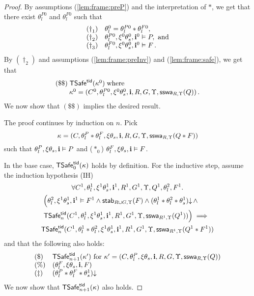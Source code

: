 \begin{proof}
By assumptions (\ref{lem:frame:preP}) %
and the interpretation of $*$, we get that 
there exist $\theta^{P0}_{l}$ and $\theta_l^{F0}$ such that 
$$
\begin{array}{ll}
(\dag_1) &\theta^0_l =\theta^{P0}_{l}*\theta_l^{F0}, \\
(\dag_2) &\theta_l^{P0},\xi^0\theta^0_s,\intp^0 \vDash P, ~\text{and}\\
(\dag_3) &\theta_l^{F0},\xi^0\theta^0_s,\intp^0 \vDash F \,.
\end{array}
$$
By $(\dag_2)$  and assumptions (\ref{lem:frame:preInv}) and (\ref{lem:frame:safe}),
we get that 
\[
\begin{array}{l}
 (\$\$) \; \safe(\kappa^0) \;\text{where}\; \\[1pt]
 \qquad \kappa^0 = (C^0,\theta^{P0}_l,\xi^0\theta^0_s,\intp,R,G,\Upsilon, \sswa{Q}{R}{\Upsilon})\,.
\end{array}
\]
We now show that $(\$\$)$ implies the desired result.

The proof continues by induction on $n$.
Pick 
$$
\kappa=(C,\theta_l^P*\theta_l^F,\xi\theta_s,\intp,R,G,\Upsilon, \sswa{Q*F}{R}{\Upsilon})
$$
such that $\theta_l^P,\xi\theta_s,\intp\vDash P$ and ($*_0$) $\theta_l^F,\xi\theta_s,\intp\vDash F$.

In the base case, $\safe_0(\kappa)$ holds by definition.
For the inductive step, 
assume 
the induction hypothesis (IH)  
\begin{multline*}
  \forall C^1,\theta^1_l,\xi^1\theta^1_s,\intp^1,R^1,G^1,\Upsilon,Q^1,\theta^2_l,F^1.\\
  \Big(\theta^2_l,\xi^1\theta^1_s,\intp^1 \vDash F^1 \land  
  \stable{F}{R \cup G}{\Upsilon} \land \consistent{\theta^1_l * \theta^2_l * \theta^1_s} \land\mbox{} 
  \qquad \\ 
  \safe_n(C^1,\theta^1_l,\xi^1\theta^1_s,\intp^1,R^1,G^1,\Upsilon,\sswa{Q^1}{R^1}{\Upsilon})\Big)
  \implies \mbox{} \\
  \safe_n(C^1,\theta^1_l*\theta^2_l,\xi^1\theta^1_s,\intp^1,R^1,G^1,\Upsilon,
  				\sswa{Q^1*F^1}{R^1}{\Upsilon})
\end{multline*}
and that the following also holds:
$$
\begin{array}{ll}
(\$ )   &\safe_{n+1}(\kappa') \ \text{for} \
\kappa' = (C,\theta^P_l,\xi\theta_s,\intp,R,G,\Upsilon,\sswa{Q}{R}{\Upsilon})\\  
(\%)    & (\theta^F_l,\xi\theta_s,\intp,F)\\ 
(\ddag) & \consistent{\theta^P_l * \theta^F_l * \theta^1_s}
\end{array}
$$
We now show that $\safe_{n+1}(\kappa)$ also holds.




\end{proof}
